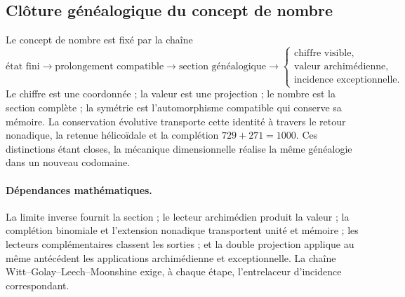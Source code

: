 \subsection{Clôture généalogique du concept de nombre}

Le concept de nombre est fixé par la chaîne
\[
 \boxed{
 \text{état fini}
 \longrightarrow\text{prolongement compatible}
 \longrightarrow\text{section généalogique}
 \longrightarrow
 \begin{cases}
   \text{chiffre visible},\\
   \text{valeur archimédienne},\\
   \text{incidence exceptionnelle}.
 \end{cases}}
\]
Le chiffre est une coordonnée ; la valeur est une projection ; le nombre est la
section complète ; la symétrie est l'automorphisme compatible qui conserve sa
mémoire. La conservation évolutive transporte cette identité à travers le
retour nonadique, la retenue hélicoïdale et la complétion
\(729+271=1000\). Ces distinctions étant closes, la mécanique dimensionnelle
réalise la même généalogie dans un nouveau codomaine.

\paragraph{Dépendances mathématiques.}
La limite inverse fournit la section ; le lecteur archimédien produit la
valeur ; la complétion binomiale et l'extension nonadique transportent unité et
mémoire ; les lecteurs complémentaires classent les sorties ; et la double
projection applique au même antécédent les applications archimédienne et exceptionnelle.
La chaîne Witt--Golay--Leech--Moonshine exige, à chaque étape,
l'entrelaceur d'incidence correspondant.
